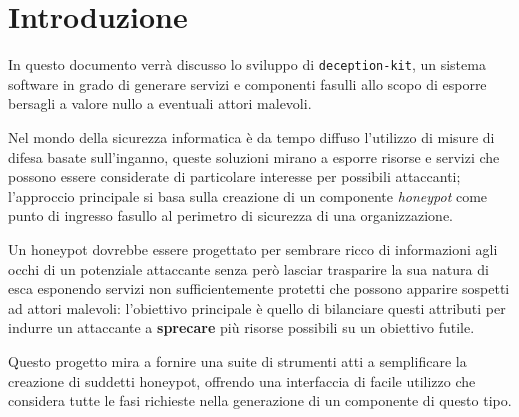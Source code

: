 \section{Introduzione}

In questo documento verrà discusso lo sviluppo di \texttt{deception-kit}, un sistema software in grado di generare servizi e componenti fasulli allo scopo di esporre bersagli a valore nullo a eventuali attori malevoli.

Nel mondo della sicurezza informatica è da tempo diffuso l'utilizzo di misure di difesa basate sull'inganno, queste soluzioni mirano a esporre risorse e servizi che possono essere considerate di particolare interesse per possibili attaccanti; l'approccio principale si basa sulla creazione di un componente \textit{honeypot} come punto di ingresso fasullo al perimetro di sicurezza di una organizzazione.

Un honeypot dovrebbe essere progettato per sembrare ricco di informazioni agli occhi di un potenziale attaccante senza però lasciar trasparire la sua natura di esca esponendo servizi non sufficientemente protetti che possono apparire sospetti ad attori malevoli: l'obiettivo principale è quello di bilanciare questi attributi per indurre un attaccante a \textbf{sprecare} più risorse possibili su un obiettivo futile.

Questo progetto mira a fornire una suite di strumenti atti a semplificare la creazione di suddetti honeypot, offrendo una interfaccia di facile utilizzo che considera tutte le fasi richieste nella generazione di un componente di questo tipo.


